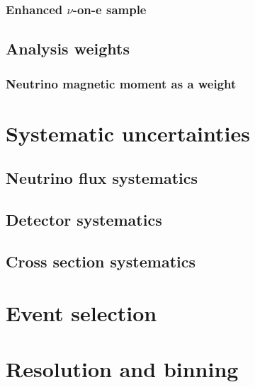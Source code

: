 \documentclass[12pt]{article}
\begin{document}
\subsubsection{Enhanced $\nu$-on-e sample}
\subsection{Analysis weights}
\subsubsection{Neutrino magnetic moment as a weight}

\section{Systematic uncertainties}
\subsection{Neutrino flux systematics}
\subsection{Detector systematics}
\subsection{Cross section systematics}

\section{Event selection}

\section{Resolution and binning}



\end{document}
